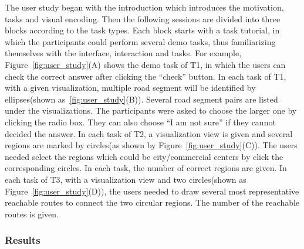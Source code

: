 The user study began with the introduction which introduces the motivation, tasks and visual encoding. Then the following sessions are divided into three blocks according to the task types. Each block starts with a task tutorial, in which the participants could perform several demo tasks, thus familiarizing themselves with the interface, interaction and tasks. For example, Figure~\ref{fig:user_study}(A) shows the demo task of T1, in which the users can check the correct answer after clicking the ``check'' button. 
In each task of T1, with a given visualization, multiple road segment will be identified by ellipses(shown as~\ref{fig:user_study}(B)). Several road segment pairs are listed under the visualizations. The participants were asked to choose the larger one by clicking the radio box. They can also choose ``I am not sure'' if they cannot decided the answer. 
In each task of T2, a visualization view is given and several regions are marked by circles(as shown by Figure~\ref{fig:user_study}(C)). The users needed select the regions which could be city/commercial centers by click the corresponding circles. In each task, the number of correct regions are given. 
In each task of T3, with a visualization view and two circles(shown as Figure~\ref{fig:user_study}(D)), the users needed to draw several most representative reachable routes to connect the two circular regions. The number of the reachable routes is given.  

\subsubsection{Results}



